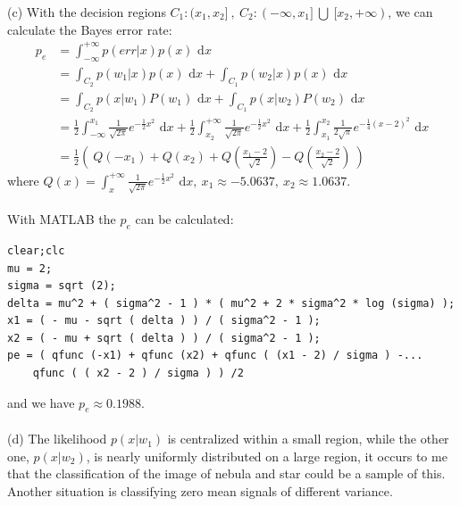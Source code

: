 \documentclass[12pt]{article}
\begin{document}
\noindent (c) With the decision regions $C_1:(x_1,x_2]\ ,\ C_2:(-\infty, x_1]\ \bigcup\ [x_2,+\infty)$, we can calculate the Bayes error rate:
\begin{equation*}
\begin{aligned}
p_e&=\int^{+\infty}_{-\infty}p(err|x)p(x)\text{ d}x\\
&=\int_{C_2}p(w_1|x)p(x)\text{ d}x+\int_{C_1}p(w_2|x)p(x)\text{ d}x\\
&=\int_{C_2}p(x|w_1)P(w_1)\text{ d}x+\int_{C_1}p(x|w_2)P(w_2)\text{ d}x\\
&=\frac{1}{2} \int^{x_1}_{-\infty} \frac{1}{\sqrt{2\pi}} e^{-\frac{1}{2} x^2} \text{ d}x + \frac{1}{2} \int^{+\infty}_{x_2} \frac{1}{\sqrt{2\pi}} e^{-\frac{1}{2} x^2} \text{ d}x +   \frac{1}{2} \int^{x_2}_{x_1}\frac{1}{2\sqrt{\pi}} e^{-\frac{1}{4} (x-2)^2} \text{ d}x\\
&=\frac{1}{2} (\ Q(-x_1)+Q(x_2)+Q(\frac{x_1-2}{\sqrt{2}})-Q(\frac{x_2-2}{\sqrt{2}})\ )
\end{aligned}
\end{equation*}
where $Q(x)=\int^{+\infty}_x \frac{1}{\sqrt{2\pi}} e^{ -\frac{1}{2} x^2} \text{ d}x,\ x_1\approx-5.0637,\ x_2\approx1.0637$.\\
\\With MATLAB the $p_e$ can be calculated:
\begin{lstlisting}
clear;clc
mu = 2;
sigma = sqrt (2);
delta = mu^2 + ( sigma^2 - 1 ) * ( mu^2 + 2 * sigma^2 * log (sigma) );
x1 = ( - mu - sqrt ( delta ) ) / ( sigma^2 - 1 );
x2 = ( - mu + sqrt ( delta ) ) / ( sigma^2 - 1 );
pe = ( qfunc (-x1) + qfunc (x2) + qfunc ( (x1 - 2) / sigma ) -...
    qfunc ( ( x2 - 2 ) / sigma ) ) /2
\end{lstlisting}
and we have $p_e\approx 0.1988$.\\
\\(d) The likelihood $p(x|w_1)$ is centralized within a small region, while the other one, $p(x|w_2)$, is nearly uniformly distributed on a large region, it occurs to me that the classification of the image of nebula and star could be a sample of this. Another situation is classifying zero mean signals of different variance.\\

\end{document}
